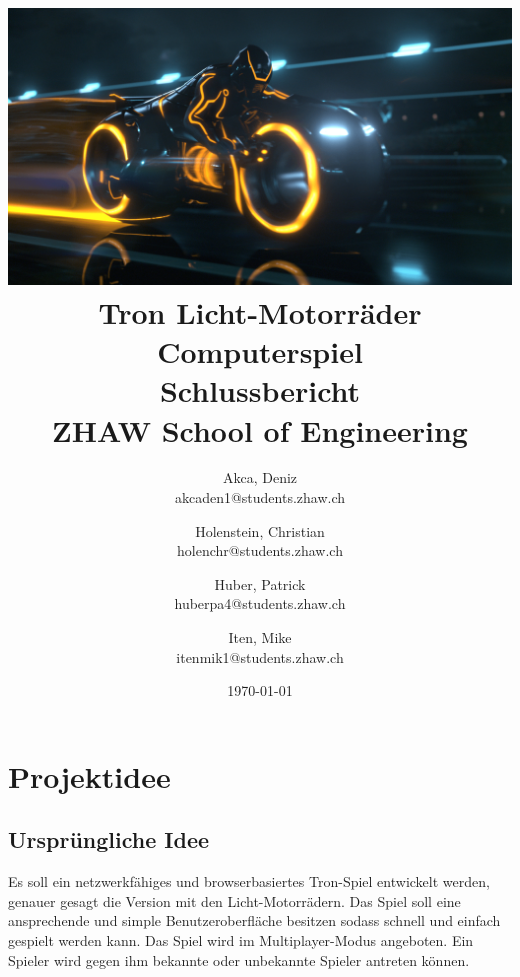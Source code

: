\documentclass[11pt,ngerman]{article}
\begin{document}
    \title{\includegraphics[width=1\textwidth]{figures/Tron-Legacy_Bike.png}\\ Tron Licht-Motorräder Computerspiel\\
        \vspace{1cm}
        \smaller{}Schlussbericht \\
        \vspace{0.5cm}
        \small{}ZHAW  School of Engineering
        \vspace{1.5cm}
    }
    \author{
        Akca, Deniz\\
        \small{akcaden1@students.zhaw.ch}
        \and
        Holenstein, Christian\\
        \small{holenchr@students.zhaw.ch}
        \and
        Huber, Patrick\\
        \small{huberpa4@students.zhaw.ch}
        \and
        Iten, Mike\\
        \small{itenmik1@students.zhaw.ch}
        \vspace{1.5cm}
    }
   \date{\today}

    \maketitle
    \newpage

    \tableofcontents
    \newpage

    \section{Projektidee}

    \subsection{Ursprüngliche Idee}
    Es soll ein netzwerkfähiges und browserbasiertes Tron-Spiel entwickelt werden, genauer gesagt die Version mit den  Licht-Motorrädern. Das Spiel soll eine ansprechende und simple Benutzeroberfläche besitzen sodass schnell und einfach gespielt werden kann. Das Spiel wird im \Gls{Multiplayer}-Modus angeboten. Ein Spieler wird gegen ihm bekannte oder unbekannte Spieler antreten können.
\end{document}
